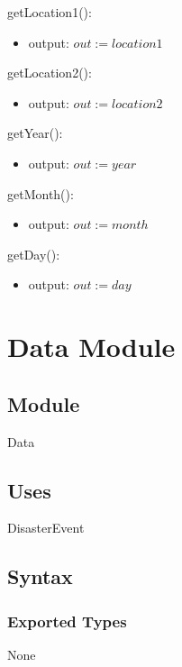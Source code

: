 \documentclass[12pt]{article}
\begin{document}
\noindent getLocation1():
\begin{itemize}
\item output: $out := location1$
\end{itemize}

\noindent getLocation2():
\begin{itemize}
\item output: $out := location2$
\end{itemize}

\noindent getYear():
\begin{itemize}
\item output: $out := year$
\end{itemize}

\noindent getMonth():
\begin{itemize}
\item output: $out := month$
\end{itemize}

\noindent getDay():
\begin{itemize}
\item output: $out := day$
\end{itemize}

\newpage





\section* {Data Module}

\subsection* {Module}

Data

\subsection* {Uses}

DisasterEvent

\subsection* {Syntax}

\subsubsection* {Exported Types}

None
\end{document}

